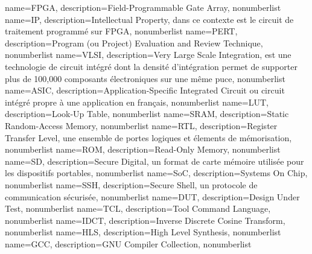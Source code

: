 {
	name=FPGA,
	description={Field-Programmable Gate Array},
	nonumberlist
}
{
	name=IP,
	description={Intellectual Property, dans ce contexte est le circuit de traitement programmé sur FPGA},
	nonumberlist
}
{
	name=PERT,
	description={Program (ou Project) Evaluation and Review Technique},
	nonumberlist
}
{
	name=VLSI,
	description={Very Large Scale Integration, est une technologie de circuit intégré dont la densité d'intégration
				permet de supporter plus de 100,000 composants électroniques sur une même puce},
	nonumberlist
}
{
	name=ASIC,
	description={Application-Specific Integrated Circuit ou circuit intégré propre à une application en français},
	nonumberlist
}
{
	name=LUT,
	description={Look-Up Table},
	nonumberlist
}
{
	name=SRAM,
	description={Static Random-Access Memory},
	nonumberlist
}
{
	name=RTL,
	description={Register Transfer Level, une ensemble de portes logiques et élements de mémorisation},
	nonumberlist
}
{
	name=ROM,
	description={Read-Only Memory},
	nonumberlist
}
{
	name=SD,
	description={Secure Digital, un format de carte mémoire utilisée pour les dispositifs portables},
	nonumberlist
}
{
	name=SoC,
	description={Systems On Chip},
	nonumberlist
}
{
	name=SSH,
	description={Secure Shell, un protocole de communication sécurisée},
	nonumberlist
}
{
	name=DUT,
	description={Design Under Test},
	nonumberlist
}
{
	name=TCL,
	description={Tool Command Language},
	nonumberlist
}
{
	name=IDCT,
	description={Inverse Discrete Cosine Transform},
	nonumberlist
}
{
	name=HLS,
	description={High Level Synthesis},
	nonumberlist
}
{
	name=GCC,
	description={GNU Compiler Collection},
	nonumberlist
}






























